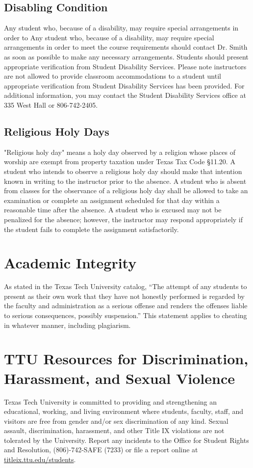 \documentclass[12pt, notitlepage]{article}   	%
\begin{document}
{\subsection{Disabling Condition}
Any student who, because of a disability, may require special arrangements in order to 
Any student who, because of a disability, may require special arrangements in order to 
meet the course requirements should contact Dr. Smith as soon as possible to make 
any necessary arrangements. Students should present appropriate verification from Student 
Disability Services. Please note instructors are not 
allowed to provide classroom accommodations to a student until appropriate verification 
from Student Disability Services has been provided. For additional information, you may 
contact the Student Disability Services office at 335 West Hall or 806-742-2405.

\subsection{Religious Holy Days}
"Religious holy day" means a holy day observed by a religion whose places of worship are 
exempt from property taxation under Texas Tax Code §11.20.
A student who intends to observe a religious holy day should make that intention known 
in writing to the instructor prior to the absence. A student who is absent from classes 
for the observance of a religious holy day shall be allowed to take an examination or 
complete an assignment scheduled for that day within a reasonable time after the absence.
A student who is excused may not be penalized for the absence; however, the instructor 
may respond appropriately if the student fails to complete the assignment satisfactorily.

\section{Academic Integrity}
As stated in the Texas Tech University catalog, “The attempt of any students to present 
as their own work that they have not honestly performed is regarded by the faculty and 
administration as a serious offense and renders the offenses liable to serious 
consequences, possibly suspension.” This statement applies to cheating in whatever 
manner, including plagiarism.

\section{TTU Resources for Discrimination, Harassment, and Sexual Violence}
Texas Tech University is committed to providing and strengthening an educational, 
working, and living environment where students, faculty, staff, and visitors are 
free from gender and/or sex discrimination of any kind. Sexual assault, discrimination, 
harassment, and other Title IX violations are not tolerated by the University. 
Report any incidents to the Office for Student Rights and Resolution, 
(806)-742-SAFE (7233) or file a report online at 
\url{titleix.ttu.edu/students}. 

}
\end{document}

